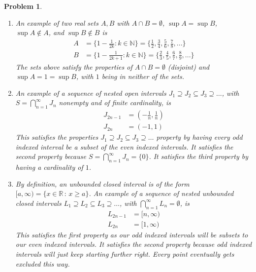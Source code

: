 \documentclass[12pt]{article}
\newtheorem{problem}{Problem}
\newcommand{\NN}{\ensuremath{\mathbb N}}
\newcommand{\RR}{\ensuremath{\mathbb R}}
\begin{document}
\begin{problem} %
\phantom{foo}

\renewcommand{\labelenumi}{(\alph{enumi})}
\begin{enumerate}
\item An example of two real sets $A,B$ with $A\cap B=\emptyset$, $\sup A = \sup B$, $\sup A \notin A$, and $\sup B \notin B$ is
  \begin{align*}
    A &= \{1 - \frac{1}{2k} : k \in \NN\} = \{\frac{1}{2}, \frac{3}{4}, \frac{5}{6}, \frac{7}{8},...\} \\
    B &= \{1 - \frac{1}{2k+1} : k \in \NN\} = \{\frac{2}{3}, \frac{4}{5}, \frac{6}{7}, \frac{8}{9},... \}
\end{align*}
  The sets above satisfy the properties of $A \cap B = \emptyset$ (disjoint) and $\sup A = 1 = \sup B$, with $1$ being in neither of the sets.
\item An example of a sequence of nested open intervals $J_1\supseteq J_2 \subseteq J_3 \supseteq \dots$, with $S=\bigcap_{n=1}^\infty J_n$ nonempty and of finite cardinality, is
\begin{align*}
  J_{2n-1} &= (-\frac{1}{n}, \frac{1}{n})\\
  J_{2n} &= (-1,1) 
\end{align*}
This satisfies the properties $J_1 \supseteq J_2 \subseteq J_3 \supseteq \dots$ property by having every odd indexed interval be a subset of the even indexed intervals. It satisfies the second property because $S=\bigcap_{n=1}^\infty J_n = \{0\}$. It satisfies the third property by having a cardinality of $1$. 
\item By definition, an unbounded closed interval is of the form $[a,\infty) = \{x\in\RR \,:\, x \ge a\}$.  An example of a sequence of nested unbounded closed intervals $L_1\supseteq L_2 \subseteq L_3 \supseteq \dots$, with $\bigcap_{n=1}^\infty L_n = \emptyset$, is
\begin{align*}
  L_{2n-1} &= [n, \infty) \\
  L_{2n} &= [1, \infty)
\end{align*}
This satisfies the first property as our odd indexed intervals will be subsets to our even indexed intervals. It satisfies the second property because odd indexed intervals will just keep starting further right. Every point eventually gets excluded this way.
\end{enumerate}
\end{problem}
\end{document}
